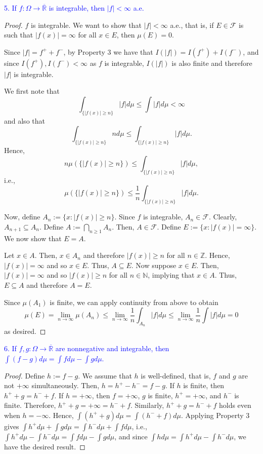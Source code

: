 \documentclass[12pt]{extarticle}
\newcommand{\F}{\mathscr{F}}
\newcommand{\R}{\overline{\mathbb{R}}}
\newcommand{\sub}{\subseteq}
\begin{document}
\textcolor{blue}{5. If $f:\Omega \to \R$ is integrable, then $|f| < \infty$ a.e.}
\begin{proof}
    $f$ is integrable. We want to show that $|f| < \infty$ a.e., that is, if $E \in \F$ is such that $|f(x)| = \infty$ for all $x \in E$, then $\mu(E) = 0$.
    
    Since $|f| = f^+ + f^-$, by Property 3 we have that $I(|f|) = I(f^+) + I(f^-)$, and since $I(f^+), I(f^-) < \infty$ as $f$ is integrable, $I(|f|)$ is also finite and therefore $|f|$ is integrable.

    We first note that 
    \begin{equation*}
        \int_{\{|f(x)| \geq n\}} |f| d\mu \leq \int|f| d\mu < \infty
    \end{equation*}
    and also that $$\int_{\{|f(x)| \geq n\}} n d\mu \leq \int_{\{|f(x)| \geq n\}} |f| d\mu.$$ Hence, $$n \mu(\{|f(x)| \geq n\}) \leq \int_{\{|f(x)| \geq n\}} |f| d\mu,$$ i.e., $$\mu(\{|f(x)| \geq n\}) \leq \frac{1}{n}\int_{\{|f(x)| \geq n\}} |f| d\mu.$$

    Now, define $A_n := \{x: |f(x)| \geq n\}$. Since $f$ is integrable, $A_n \in \F$. Clearly, $A_{n + 1} \subseteq A_{n}$. Define $A := \bigcap_{n \geq 1} A_n$. Then, $A \in \F$. Define $E := \{ x : |f(x)| = \infty\}$. We now show that $E = A$. 
    
    Let $x \in A$. Then, $x \in A_n$ and therefore $|f(x)| \geq n$ for all $n \in \mathbb{Z}$. Hence, $|f(x)| = \infty$ and so $x \in E$. Thus, $A \sub E$. Now suppose $x \in E$. Then, $|f(x)| = \infty$ and so $|f(x)| \geq n$ for all $n \in \mathbb{N}$, implying that $x \in A$. Thus, $E \sub A$ and therefore $A = E$.

    Since $\mu(A_1)$ is finite, we can apply continuity from above to obtain
    \begin{equation*}
        \mu(E) = \lim_{n \to \infty} \mu(A_n) \leq \lim_{n \to \infty} \frac{1}{n} \int_{A_n} |f| d\mu \leq \lim_{n \to \infty} \frac{1}{n} \int|f|d\mu = 0
    \end{equation*}
    as desired.    
\end{proof}

\textcolor{blue}{6. If $f, g: \Omega \to \R$ are nonnegative and integrable, then $\int(f - g) d\mu = \int fd\mu - \int g d\mu$.}
\begin{proof}
    Define $h:= f - g$. We assume that $h$ is well-defined, that is, $f$ and $g$ are not $+\infty$ simultaneously. Then, $h = h^+ - h^- = f - g$. If $h$ is finite, then $h^+ + g = h^- + f$. If $h = +\infty$, then $f = +\infty$, $g$ is finite, $h^+ = +\infty$, and $h^-$ is finite. Therefore, $h^+ + g = +\infty = h^- + f$. Similarly, $h^+ + g = h^- + f$ holds even when $h = -\infty$. Hence, $\int(h^+ + g) d\mu = \int(h^- + f) d\mu$. Applying Property 3 gives $\int h^+ d\mu + \int g d\mu = \int h^- d\mu + \int f d\mu$, i.e., $\int h^+ d\mu - \int h^- d\mu = \int fd\mu - \int g d\mu$, and since $\int h d\mu = \int h^+ d\mu - \int h^- d\mu$, we have the desired result.
\end{proof}
\end{document}
